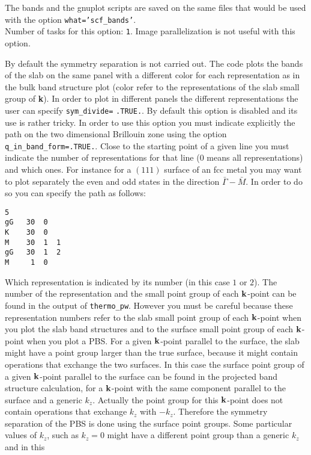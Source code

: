 \documentclass[12pt,a4paper]{article}
\begin{document}
The bands and the gnuplot scripts are saved on the same files that would
be used with the option \texttt{what='scf\_bands'}. \\
Number of tasks for this option: \texttt{1}. Image parallelization is
not useful with this option. 

By default the symmetry separation is not carried out. The code plots the
bands of the slab on the same panel with a different color for each 
representation as in the bulk band structure plot (color refer to the 
representations of the slab small group of {\bf k}). 
In order to plot in different panels the different representations
the user can specify \texttt{sym\_divide=} \texttt{.TRUE.}.
By default this option is disabled and its use is rather tricky.
In order to use this option you must indicate explicitly the
path on the two dimensional Brillouin zone using the option
\texttt{q\_in\_band\_form=.TRUE.}. Close to the
starting point of a given line you must indicate the number of 
representations for that line ($0$ means all representations) and which ones.
For instance for a $(111)$ surface of an fcc metal you may
want to plot separately the even and odd states in the direction 
$\bar \Gamma-\bar M$. In order to do so you can specify the path as follows:
\begin{verbatim}
5
gG   30  0
K    30  0
M    30  1  1
gG   30  1  2
M     1  0
\end{verbatim}
Which representation is indicated by its number (in this case $1$ or $2$).
The number of the representation and the small point group of each 
${\bf k}$-point can be found in the output of \texttt{thermo\_pw}.
However you must be careful because these representation numbers refer
to the slab small point group of each ${\bf k}$-point when you
plot the slab band structures and to the surface small point 
group of each ${\bf k}$-point when you plot a PBS.
For a given ${\bf k}$-point parallel to the surface, the slab
might have a point group larger than the true surface, because it 
might contain operations that exchange the two surfaces.
In this case the surface point group of a given ${\bf k}$-point parallel 
to the surface can be found in the projected band structure calculation,
for a ${\bf k}$-point with the same component parallel to the surface
and a generic $k_z$. Actually the point group for this ${\bf k}$-point 
does not contain operations that exchange $k_z$ with $-k_z$.
Therefore the symmetry separation of the PBS is done using the
surface point groups. Some particular values of $k_z$, such as $k_z=0$
might have a different point group than a generic $k_z$ and in this
\end{document}
